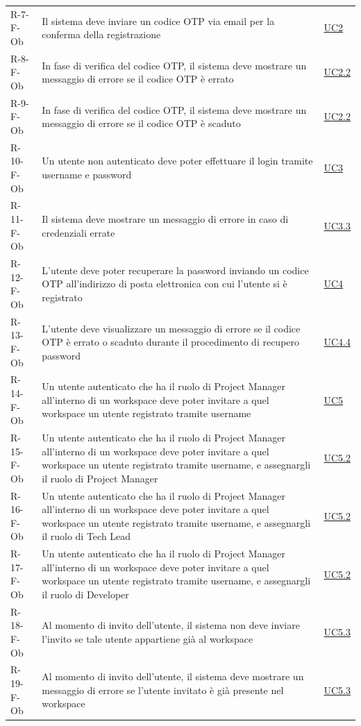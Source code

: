 \documentclass[a4paper, 11pt]{article}
\begin{document}
\begin{longtable}[c]{ >{\centering\arraybackslash}m{2.5cm} >{\centering\arraybackslash}m{8.3cm} >{\centering\arraybackslash}m{3.5cm} }
    R-7-F-Ob & Il sistema deve inviare un codice OTP via email per la conferma della registrazione & \hyperref[UC2]{UC2}\\
    R-8-F-Ob & In fase di verifica del codice OTP, il sistema deve mostrare un messaggio di errore se il codice OTP è errato & \hyperref[UC2.2]{UC2.2}\\
    R-9-F-Ob & In fase di verifica del codice OTP, il sistema deve mostrare un messaggio di errore se il codice OTP è scaduto & \hyperref[UC2.2]{UC2.2}\\
    R-10-F-Ob & Un utente non autenticato deve poter effettuare il login tramite username e password & \hyperref[UC3]{UC3}\\
    R-11-F-Ob & Il sistema deve mostrare un messaggio di errore in caso di credenziali errate & \hyperref[UC3.3]{UC3.3}\\
    R-12-F-Ob & L’utente deve poter recuperare la password inviando un codice OTP all'indirizzo di posta elettronica con cui l'utente si è registrato & \hyperref[UC4]{UC4}\\
    R-13-F-Ob & L'utente deve visualizzare un messaggio di errore se il codice OTP è errato o scaduto durante il procedimento di recupero password & \hyperref[UC4.4]{UC4.4}\\
    R-14-F-Ob & Un utente autenticato che ha il ruolo di Project Manager all'interno di un workspace deve poter invitare a quel workspace un utente registrato tramite username & \hyperref[UC5]{UC5}\\
    R-15-F-Ob & Un utente autenticato che ha il ruolo di Project Manager all'interno di un workspace deve poter invitare a quel workspace un utente registrato tramite username, e assegnargli il ruolo di Project Manager & \hyperref[UC5.2]{UC5.2}\\
    R-16-F-Ob & Un utente autenticato che ha il ruolo di Project Manager all'interno di un workspace deve poter invitare a quel workspace un utente registrato tramite username, e assegnargli il ruolo di Tech Lead & \hyperref[UC5.2]{UC5.2}\\
    R-17-F-Ob & Un utente autenticato che ha il ruolo di Project Manager all'interno di un workspace deve poter invitare a quel workspace un utente registrato tramite username, e assegnargli il ruolo di Developer & \hyperref[UC5.2]{UC5.2}\\
    R-18-F-Ob & Al momento di invito dell'utente, il sistema non deve inviare l'invito se tale utente appartiene già al workspace & \hyperref[UC5.3]{UC5.3}\\
    R-19-F-Ob & Al momento di invito dell'utente, il sistema deve mostrare un messaggio di errore se l'utente invitato è già presente nel workspace & \hyperref[UC5.3]{UC5.3}\\

\end{longtable}
\end{document}
